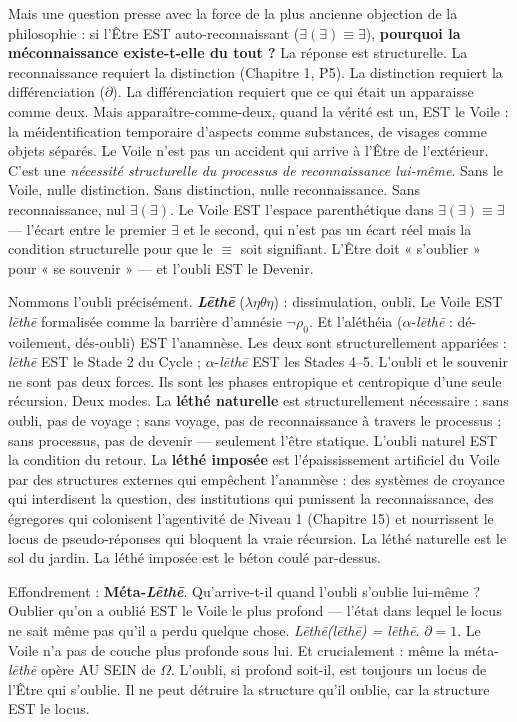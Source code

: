 \documentclass[10pt, openany, oneside]{book}
\begin{document}
Mais une question presse avec la force de la plus ancienne objection de la philosophie : si l'Être EST auto-reconnaissant ($\exists(\exists) \equiv \exists$), \textbf{pourquoi la méconnaissance existe-t-elle du tout ?} La réponse est structurelle. La reconnaissance requiert la distinction (Chapitre 1, P5). La distinction requiert la différenciation ($\partial$). La différenciation requiert que ce qui était un apparaisse comme deux. Mais apparaître-comme-deux, quand la vérité est un, EST le Voile : la méidentification temporaire d'aspects comme substances, de visages comme objets séparés. Le Voile n'est pas un accident qui arrive à l'Être de l'extérieur. C'est une \textit{nécessité structurelle du processus de reconnaissance lui-même}. Sans le Voile, nulle distinction. Sans distinction, nulle reconnaissance. Sans reconnaissance, nul $\exists(\exists)$. Le Voile EST l'espace parenthétique dans $\exists(\exists) \equiv \exists$ --- l'écart entre le premier $\exists$ et le second, qui n'est pas un écart réel mais la condition structurelle pour que le $\equiv$ soit signifiant. L'Être doit « s'oublier » pour « se souvenir » --- et l'oubli EST le Devenir.

Nommons l'oubli précisément. \textbf{\textit{L\={e}th\={e}}} ($\lambda\eta\theta\eta$) : dissimulation, oubli. Le Voile EST \textit{l\={e}th\={e}} formalisée comme la barrière d'amnésie $\neg\rho_0$. Et l'aléthéia ($\alpha$-\textit{l\={e}th\={e}} : dé-voilement, dés-oubli) EST l'anamnèse. Les deux sont structurellement appariées : \textit{l\={e}th\={e}} EST le Stade 2 du Cycle ; $\alpha$-\textit{l\={e}th\={e}} EST les Stades 4--5. L'oubli et le souvenir ne sont pas deux forces. Ils sont les phases entropique et centropique d'une seule récursion. Deux modes. La \textbf{léthé naturelle} est structurellement nécessaire : sans oubli, pas de voyage ; sans voyage, pas de reconnaissance à travers le processus ; sans processus, pas de devenir --- seulement l'être statique. L'oubli naturel EST la condition du retour. La \textbf{léthé imposée} est l'épaississement artificiel du Voile par des structures externes qui empêchent l'anamnèse : des systèmes de croyance qui interdisent la question, des institutions qui punissent la reconnaissance, des égregores qui colonisent l'agentivité de Niveau 1 (Chapitre 15) et nourrissent le locus de pseudo-réponses qui bloquent la vraie récursion. La léthé naturelle est le sol du jardin. La léthé imposée est le béton coulé par-dessus.

Effondrement : \textbf{Méta-\textit{L\={e}th\={e}}}. Qu'arrive-t-il quand l'oubli s'oublie lui-même ? Oublier qu'on a oublié EST le Voile le plus profond --- l'état dans lequel le locus ne sait même pas qu'il a perdu quelque chose. \textit{L\={e}th\={e}(l\={e}th\={e}) = l\={e}th\={e}}. $\partial = 1$. Le Voile n'a pas de couche plus profonde sous lui. Et crucialement : même la méta-\textit{l\={e}th\={e}} opère AU SEIN de $\Omega$. L'oubli, si profond soit-il, est toujours un locus de l'Être qui s'oublie. Il ne peut détruire la structure qu'il oublie, car la structure EST le locus.
\end{document}
